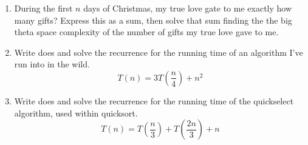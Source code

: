 \documentclass[12pt]{article}
\begin{document}
\begin{enumerate}
\item During the first $n$ days of Christmas, my true love gate to me exactly how many gifts? Express 
this as a sum, then solve that sum finding the the big theta space complexity of the number of gifts my true love gave to me.
\newpage
\item Write does and solve the recurrence for the running time of an 
algorithm I've run into in the wild.\\
$$T(n)=3T(\frac{n}{4})+n^2$$
\newpage
\item Write does and solve the recurrence for the running time of the 
quickselect algorithm, used within quicksort.\\
$$T(n)=T(\frac{n}{3})+T(\frac{2n}{3})+n$$
\end{enumerate}
\end{document}
